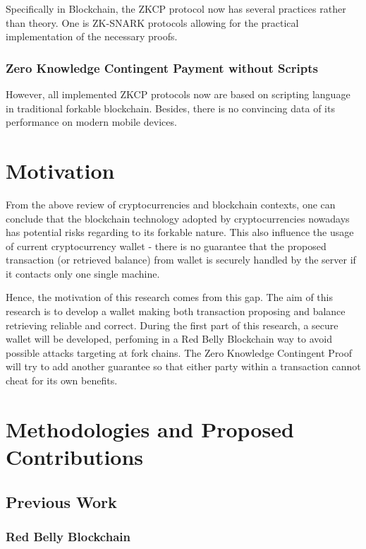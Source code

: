 \documentclass[12pt]{article}
\begin{document}
Specifically in Blockchain, the ZKCP protocol now has several practices rather than theory. One is ZK-SNARK protocols allowing for the practical implementation of the necessary proofs\cite{kalai2006succinct}\cite{ben2015secure}\cite{ecc2011}.

\subsubsection{Zero Knowledge Contingent Payment without Scripts}

However, all implemented ZKCP protocols now are based on scripting language in traditional forkable blockchain\cite{Banasik2016}. Besides, there is no convincing data of its performance on modern mobile devices\cite{doi:10.1080/00207160.2014.933816}.

\section{Motivation}

From the above review of cryptocurrencies and blockchain contexts, one can conclude that the blockchain technology adopted by cryptocurrencies nowadays has potential risks regarding to its forkable nature. This also influence the usage of current cryptocurrency wallet - there is no guarantee that the proposed transaction (or retrieved balance) from wallet is securely handled by the server if it contacts only one single machine.

Hence, the motivation of this research comes from this gap. The aim of this research is to develop a wallet making both transaction proposing and balance retrieving reliable and correct. During the first part of this research, a secure wallet will be developed, perfoming in a Red Belly Blockchain way to avoid possible attacks targeting at fork chains. The Zero Knowledge Contingent Proof will try to add another guarantee so that either party within a transaction cannot cheat for its own benefits.

\section{Methodologies and Proposed Contributions}

\subsection{Previous Work}

\subsubsection{Red Belly Blockchain}
\end{document}
